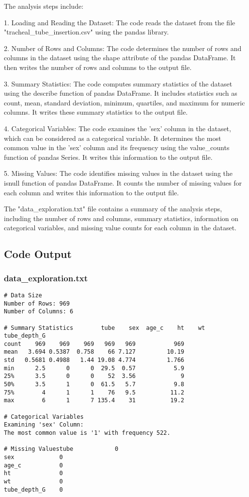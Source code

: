 \documentclass[11pt]{article}
\begin{document}
The analysis steps include:

1. Loading and Reading the Dataset:
The code reads the dataset from the file "tracheal\_tube\_insertion.csv" using the pandas library.

2. Number of Rows and Columns:
The code determines the number of rows and columns in the dataset using the shape attribute of the pandas DataFrame. It then writes the number of rows and columns to the output file.

3. Summary Statistics:
The code computes summary statistics of the dataset using the describe function of pandas DataFrame. It includes statistics such as count, mean, standard deviation, minimum, quartiles, and maximum for numeric columns. It writes these summary statistics to the output file.

4. Categorical Variables:
The code examines the 'sex' column in the dataset, which can be considered as a categorical variable. It determines the most common value in the 'sex' column and its frequency using the value\_counts function of pandas Series. It writes this information to the output file.

5. Missing Values:
The code identifies missing values in the dataset using the isnull function of pandas DataFrame. It counts the number of missing values for each column and writes this information to the output file.

The "data\_exploration.txt" file contains a summary of the analysis steps, including the number of rows and columns, summary statistics, information on categorical variables, and missing value counts for each column in the dataset.

\subsection{Code Output}

\subsubsection*{data\_exploration.txt}

\begin{Verbatim}[tabsize=4]
# Data Size
Number of Rows: 969
Number of Columns: 6

# Summary Statistics        tube    sex  age_c    ht    wt  tube_depth_G
count    969    969    969   969   969           969
mean   3.694 0.5387  0.758    66 7.127         10.19
std   0.5681 0.4988   1.44 19.08 4.774         1.766
min      2.5      0      0  29.5  0.57           5.9
25%      3.5      0      0    52  3.56             9
50%      3.5      1      0  61.5   5.7           9.8
75%        4      1      1    76   9.5          11.2
max        6      1      7 135.4    31          19.2

# Categorical Variables
Examining 'sex' Column:
The most common value is '1' with frequency 522.

# Missing Valuestube            0
sex             0
age_c           0
ht              0
wt              0
tube_depth_G    0
\end{Verbatim}
\end{document}
